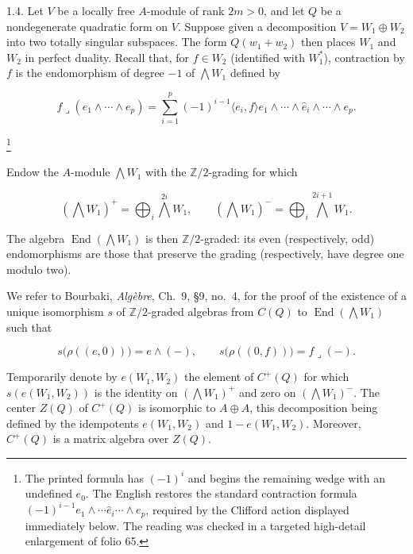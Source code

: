 1.4. Let $V$ be a locally free $A$-module of rank $2m>0$, and let $Q$
be a nondegenerate quadratic form on $V$.  Suppose given a decomposition
$V=W_1\oplus W_2$ into two totally singular subspaces.  The form
$Q(w_1+w_2)$ then places $W_1$ and $W_2$ in perfect duality.  Recall that,
for $f\in W_2$ (identified with $W_1^*$), contraction by $f$ is the
endomorphism of degree $-1$ of $\bigwedge W_1$ defined by

\begin{equation*}
f\mathbin{\lrcorner}(e_1\wedge\cdots\wedge e_p)
=\sum_{i=1}^{p}(-1)^{i-1}\langle e_i,f\rangle
e_1\wedge\cdots\wedge\widehat e_i\wedge\cdots\wedge e_p.
\end{equation*}

\footnote{The printed formula has $(-1)^i$ and begins the remaining wedge
with an undefined $e_0$.  The English restores the standard contraction
formula $(-1)^{i-1}e_1\wedge\cdots\widehat e_i\cdots\wedge e_p$, required
by the Clifford action displayed immediately below.  The reading was
checked in a targeted high-detail enlargement of folio 65.}

Endow the $A$-module $\bigwedge W_1$ with the $\mathbb Z/2$-grading for
which


\begin{equation*}
(\bigwedge W_1)^+=\bigoplus_i\bigwedge^{2i}W_1,
\qquad
(\bigwedge W_1)^-=\bigoplus_i\bigwedge^{2i+1}W_1.
\end{equation*}

The algebra $\operatorname{End}(\bigwedge W_1)$ is then
$\mathbb Z/2$-graded: its even (respectively, odd) endomorphisms are those
that preserve the grading (respectively, have degree one modulo two).

We refer to Bourbaki, \emph{Algèbre}, Ch.~9, \S9, no.~4, for the proof of
the existence of a unique isomorphism $s$ of $\mathbb Z/2$-graded algebras
from $C(Q)$ to $\operatorname{End}(\bigwedge W_1)$ such that

\begin{equation*}
s\bigl(\rho((e,0))\bigr)=e\wedge(-),
\qquad
s\bigl(\rho((0,f))\bigr)=f\mathbin{\lrcorner}(-).
\end{equation*}

Temporarily denote by $e(W_1,W_2)$ the element of $C^+(Q)$ for which
$s(e(W_1,W_2))$ is the identity on $(\bigwedge W_1)^+$ and zero on
$(\bigwedge W_1)^-$.  The center $Z(Q)$ of $C^+(Q)$ is isomorphic to
$A\oplus A$, this decomposition being defined by the idempotents
$e(W_1,W_2)$ and $1-e(W_1,W_2)$.  Moreover, $C^+(Q)$ is a matrix algebra
over $Z(Q)$.

